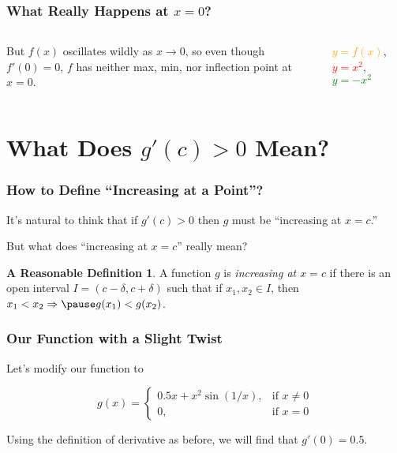 \documentclass{beamer} %
\theoremstyle{definition} %
\newtheorem*{dfn}{A Reasonable Definition}
\begin{document}
\begin{frame}
\frametitle{What Really Happens at $x=0$?}
\begin{columns} %
\begin{column}{0.5\textwidth} %
But $f(x)$ oscillates wildly as $x\to 0$, so even though $f'(0)=0$, $f$ has neither max, min, nor inflection point at $x=0$.
\end{column}

\pause

\begin{column}{0.5\textwidth} %
\begin{center}
\textcolor{orange}{$y=f(x)$}, \textcolor{red}{$y=x^2$}, \textcolor{green}{$y=-x^2$} %
\end{center}
\end{column}
\end{columns}
\end{frame}

\section{What Does $g'(c)>0$ Mean?} %

\begin{frame}
\frametitle{How to Define ``Increasing at a Point''?}
It's natural to think that if $g'(c)>0$ then $g$ must be ``increasing at $x=c$.'' 

\pause But what does ``increasing at $x=c$'' really mean?

\pause \begin{dfn} %
A function $g$ is \emph{increasing at $x=c$} if there is an open interval $I=(c-\delta,c+\delta)$ such that \pause if $x_1, x_2\in I$, \pause then $x_1<x_2\Rightarrow \pause g(x_1)<g(x_2)$.
\end{dfn}
\end{frame}

\begin{frame}
\frametitle{Our Function with a Slight Twist}
Let's modify our function to 

$$ g(x)=
\begin{cases}
0.5x+x^2\sin(1/x), &\text{if }x\neq0 \\
0, &\text{if }x=0
\end{cases}
$$

Using the definition of derivative as before, we will find that $g'(0)=0.5$. 
\end{frame}
\end{document}
